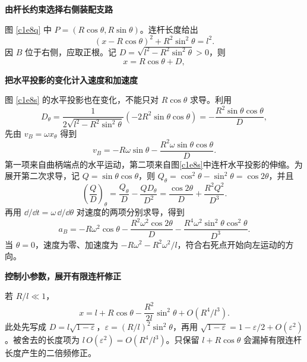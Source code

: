 \begin{solution}\textbf{由杆长约束选择右侧装配支路}\par\nobreak
图 \ref{c1e8q} 中 $P=(R\cos\theta,R\sin\theta)$。连杆长度给出
\[
 (x-R\cos\theta)^2+R^2\sin^2\theta=l^2.
\]
因 $B$ 位于右侧，应取正根。记 $D=\sqrt{l^2-R^2\sin^2\theta}>0$，则
\[
 x=R\cos\theta+D,
\]



\par\medskip{}\noindent\textbf{把水平投影的变化计入速度和加速度}\par\nobreak
图 \ref{c1e8s} 的水平投影也在变化，不能只对 $R\cos\theta$ 求导。利用
\[
 D_\theta=\frac{1}{2\sqrt{l^2-R^2\sin^2\theta}}
 (-2R^2\sin\theta\cos\theta)
 =-\frac{R^2\sin\theta\cos\theta}{D},
\]
先由 $v_B=\omega x_\theta$ 得到
\[
 v_B=-R\omega\sin\theta-\frac{R^2\omega\sin\theta\cos\theta}{D}.
\]
第一项来自曲柄端点的水平运动，第二项来自图\ref{c1e8s}中连杆水平投影的伸缩。为展开第二次求导，记 $Q=\sin\theta\cos\theta$，则 $Q_\theta=\cos^2\theta-\sin^2\theta=\cos2\theta$，并且
\[
 \left(\frac QD\right)_\theta
 =\frac{Q_\theta}{D}-\frac{QD_\theta}{D^2}
 =\frac{\cos2\theta}{D}+\frac{R^2Q^2}{D^3}.
\]
再用 $\dd/\dd t=\omega\,\dd/\dd\theta$ 对速度的两项分别求导，得到
\[
 a_B=-R\omega^2\cos\theta
 -\frac{R^2\omega^2\cos2\theta}{D}
 -\frac{R^4\omega^2\sin^2\theta\cos^2\theta}{D^3}.
\]
当 $\theta=0$，速度为零、加速度为 $-R\omega^2-R^2\omega^2/l$，符合右死点开始向左运动的方向。


\par\medskip{}\noindent\textbf{控制小参数，展开有限连杆修正}\par\nobreak
若 $R/l\ll1$，
\[
 x=l+R\cos\theta-\frac{R^2}{2l}\sin^2\theta
 +O(R^4/l^3).
\]
此处先写成 $D=l\sqrt{1-\varepsilon}$，$\varepsilon=(R/l)^2\sin^2\theta$，再用
$\sqrt{1-\varepsilon}=1-\varepsilon/2+O(\varepsilon^2)$。被舍去的长度项为 $l\,O(\varepsilon^2)=O(R^4/l^3)$。只保留 $l+R\cos\theta$ 会漏掉有限连杆长度产生的二倍频修正。




\end{solution}
